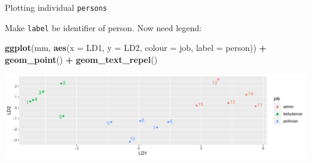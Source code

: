 \documentclass[
  ignorenonframetext,
]{beamer}
\newenvironment{Shaded}{\begin{snugshade}}{\end{snugshade}}
\newcommand{\DataTypeTok}[1]{\textcolor[rgb]{0.13,0.29,0.53}{#1}}
\newcommand{\KeywordTok}[1]{\textcolor[rgb]{0.13,0.29,0.53}{\textbf{#1}}}
\newcommand{\NormalTok}[1]{#1}
\newcommand{\OperatorTok}[1]{\textcolor[rgb]{0.81,0.36,0.00}{\textbf{#1}}}
\newcommand{\StringTok}[1]{\textcolor[rgb]{0.31,0.60,0.02}{#1}}
\begin{document}
\begin{frame}[fragile]{Plotting individual \texttt{persons}}
\protect\hypertarget{plotting-individual-persons}{}

Make \texttt{label} be identifier of person. Now need legend:

\begin{Shaded}
\begin{Highlighting}[]
\KeywordTok{ggplot}\NormalTok{(mm, }\KeywordTok{aes}\NormalTok{(}\DataTypeTok{x =}\NormalTok{ LD1, }\DataTypeTok{y =}\NormalTok{ LD2,  }\DataTypeTok{colour =}\NormalTok{ job, }
               \DataTypeTok{label =}\NormalTok{ person)) }\OperatorTok{+}\StringTok{ }
\StringTok{  }\KeywordTok{geom_point}\NormalTok{() }\OperatorTok{+}\StringTok{ }\KeywordTok{geom_text_repel}\NormalTok{()}
\end{Highlighting}
\end{Shaded}

\includegraphics{slides_d29_files/figure-beamer/unnamed-chunk-331-1.pdf}

\end{frame}
\end{document}
